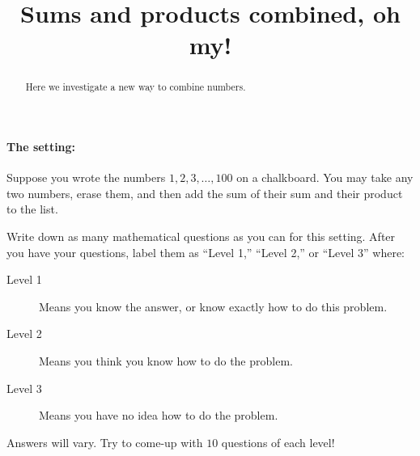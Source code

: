 \documentclass[handout,nooutcomes]{ximera}
\title[Activity:]{Sums and products combined, oh my!}
\begin{document}
\begin{abstract}
Here we investigate a new way to combine numbers.
\end{abstract}
\maketitle

\paragraph{The setting:}

Suppose you wrote the numbers $1,2,3,\dots,100$ on a chalkboard. You
may take any two numbers, erase them, and then add the sum of their
sum and their product to the list.

\begin{problem}
     Write down as many mathematical questions as you can for this
     setting. After you have your questions, label them as ``Level
     1,'' ``Level 2,'' or ``Level 3'' where:
\begin{description}
\item[Level 1] Means you know the answer, or know exactly how to do
  this problem.
\item[Level 2] Means you think you know how to do the problem.
\item[Level 3] Means you have no idea how to do the problem.
\end{description}
\begin{freeResponse}
  Answers will vary. Try to come-up with $10$ questions of each level!
\end{freeResponse}
\end{problem}




\end{document}
